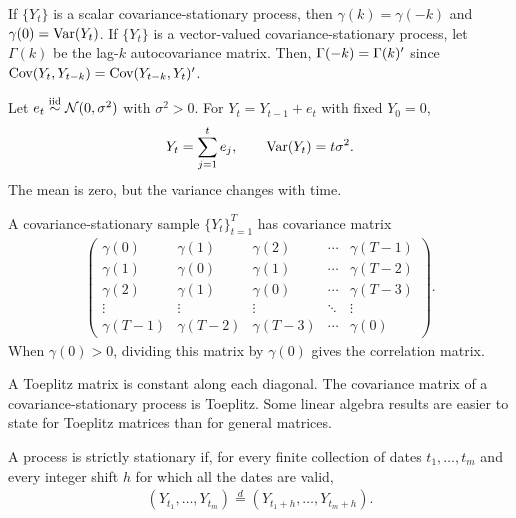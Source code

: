 \documentclass[a4paper,12pt]{article}
\begin{document}
\begin{remark}
	If $\{Y_t\}$ is a scalar covariance-stationary process,
	then $\gamma(k)=\gamma(-k)$ and $\gamma(0)=\operatorname{\text{\upshape{Var}}}(Y_t)$.
	If $\{Y_t\}$ is a vector-valued covariance-stationary process,
	let $\Gamma(k)$ be the lag-$k$ autocovariance matrix.
	Then, $\Gamma(-k)=\Gamma(k)^{\prime}$ since $\operatorname{\text{\upshape{Cov}}}(Y_t,Y_{t-k})=\operatorname{\text{\upshape{Cov}}}(Y_{t-k},Y_t)^{\prime}$.
\end{remark}

\begin{example}
	Let $e_t\overset{\text{\scriptsize iid}}{\sim}\operatorname{\mathcal{N}}(0,\sigma^2)$ with $\sigma^2>0$.
	For $Y_t=Y_{t-1}+e_t$ with fixed $Y_0=0$,
	\begin{align}
		Y_t=\sum_{j=1}^t e_j,\qquad \operatorname{\text{\upshape{Var}}}(Y_t)=t\sigma^2.
	\end{align}
	The mean is zero, but the variance changes with time.
\end{example}

\begin{definition}
	A covariance-stationary sample $\{Y_t\}_{t=1}^{T}$ has covariance matrix
	\begin{align}
		\begin{pmatrix}
			\gamma(0) & \gamma(1) & \gamma(2) & \cdots & \gamma(T-1)\\
			\gamma(1) & \gamma(0) & \gamma(1) & \cdots & \gamma(T-2)\\
			\gamma(2) & \gamma(1) & \gamma(0) & \cdots & \gamma(T-3)\\
			\vdots    & \vdots    & \vdots    & \ddots & \vdots\\
			\gamma(T-1)&\gamma(T-2)&\gamma(T-3)&\cdots&\gamma(0)
		\end{pmatrix}.
	\end{align}
	When $\gamma(0)>0$, dividing this matrix by $\gamma(0)$ gives the correlation matrix.
\end{definition}

\begin{remark}[Toeplitz]
	A Toeplitz matrix is constant along each diagonal.
	The covariance matrix of a covariance-stationary process is Toeplitz.
	Some linear algebra results are easier to state for Toeplitz matrices than for general matrices.
\end{remark}

\begin{definition}\label{def-strict-stationary}
	A process is strictly stationary if, for every finite collection of dates $t_1,\ldots,t_m$
	and every integer shift $h$ for which all the dates are valid,
	\begin{align}
		(Y_{t_1},\ldots,Y_{t_m})\overset{d}{=}(Y_{t_1+h},\ldots,Y_{t_m+h}).
	\end{align}
\end{definition}
\end{document}

